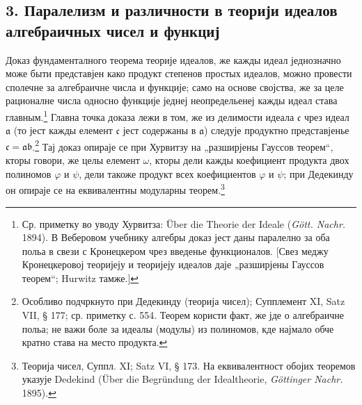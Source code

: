 ﻿\documentclass[11pt]{article}
\providecommand{\frc}{\mathfrak c}
\providecommand{\fra}{\mathfrak a}
\providecommand{\frb}{\mathfrak b}
\begin{document}
\subsection*{3. Паралелизм и различности в теорији идеалов алгебраичных чисел и функциј}
Доказ фундаменталного теорема теорије идеалов, же кажды идеал једнозначно може быти представјен како продукт степенов простых идеалов, можно провести сполечне за алгебраичне числа и функције; само на основе својства, же за целе рационалне числа односно функције једнеј неопредельенеј кажды идеал става главным.\footnote{Ср. приметку во уводу Хурвитза: Über die Theorie der Ideale (\emph{Gött. Nachr.} 1894). В Веберовом учебнику алгебры доказ јест даны паралелно за оба польа в свези с Кронецкером чрез введенье функционалов. [Свез меджу Кронецкеровој теоријеју и теоријеју идеалов даје „разширјены Гауссов теорем“; Hurwitz тамже.]} Главна точка доказа лежи в том, же из делимости идеала \(\frc\) чрез идеал \(\fra\) (то јест кажды елемент \(\frc\) јест содержаны в \(\fra\)) следује продуктно представјенье \(\frc=\fra\frb\).\footnote{Особливо подчркнуто при Дедекинду (теорија чисел); Супплемент XI, Satz VII, § 177; ср. приметку с. 554. Теорем користи факт, же јде о алгебраичне польа; не важи боле за идеалы (модулы) из полиномов, кде најмало обче кратно става на место продукта.} Тај доказ опираје се при Хурвитзу на „разширјены Гауссов теорем“, кторы говори, же целы елемент \(\omega\), кторы дели кажды коефициент продукта двох полиномов \(\varphi\) и \(\psi\), дели такоже продукт всех коефициентов \(\varphi\) и \(\psi\); при Дедекинду он опираје се на еквивалентны модуларны теорем.\footnote{Теорија чисел, Суппл. XI; Satz VI, § 173. На еквивалентност обојих теоремов указује Dedekind (Über die Begründung der Idealtheorie, \emph{Göttinger Nachr.} 1895).}
\end{document}
